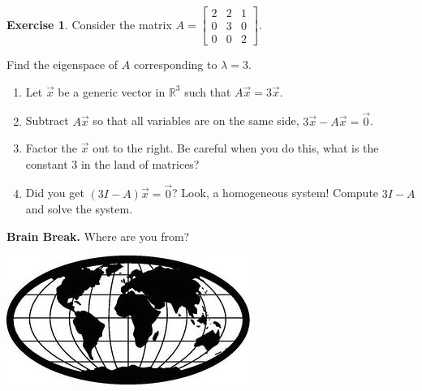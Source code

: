 \documentclass{beamer}
\newcommand{\R}{\mathbb{R}}
\newcommand{\fn}{\insertframenumber}
\theoremstyle{definition}
\newtheorem{exercise}{Exercise}
\begin{document}
\begin{frame}{\fn}
	\begin{exercise}\label{first}
		Consider the matrix $A=\begin{bmatrix}
		2&2&1\\0&3&0\\0&0&2
		\end{bmatrix}$.
		
		Find the eigenspace of $A$ corresponding to $\lambda =3$.
		\begin{enumerate}[label=(\alph*)]
			\item Let $\vec x$ be a generic vector in $\R^3$ such that $A\vec x=3\vec x$.
			\item Subtract $A\vec x$ so that all variables are on the same side, $3\vec x-A\vec x=\vec 0$.
			\item Factor the $\vec x$ out to the right.  Be careful when you do this, what is the constant 3 in the land of matrices?
			\item Did you get $(3I-A)\vec x=\vec 0$?  Look, a homogeneous system!  Compute $3I-A$ and solve the system.
		\end{enumerate}
	\end{exercise}
\end{frame}
\begin{frame}{\fn}
	\begin{block}{\textbf{Brain Break.}}
		Where are you from?
		\begin{center}
			\includegraphics[width=.7\textwidth]{../images/world}
		\end{center}
	\end{block}
\end{frame}
\end{document}
